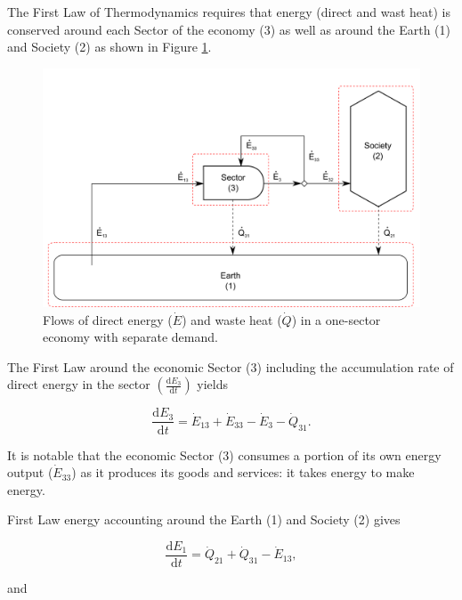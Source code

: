 The First Law of Thermodynamics requires that energy (direct and wast heat) is conserved around each Sector of the economy (3) as well as around the Earth (1) and Society (2) as shown in Figure \ref{fig:direct_energy_flows}. 

\begin{figure}[h!]
\includegraphics[width=1.0\linewidth]{Chapter_Example_B/images/I-O_two_sector_direct_energy.pdf}
\caption{Flows of direct energy ($\dot{E}$) and waste heat ($\dot{Q}$) in a one-sector economy with separate demand.}
\label{fig:direct_energy_flows}
\end{figure}

The First Law around the economic Sector (3) including the accumulation rate of direct energy in the sector $\left(\frac{\mathrm{d}E_{3}}{\mathrm{d}t}\right)$ yields

\begin{equation} \label{eq:CV_E_dot_3}
	\frac{\mathrm{d}E_{3}}{\mathrm{d}t} 	 = \dot{E}_{13} + \dot{E}_{33} - \dot{E}_{3} - \dot{Q}_{31}.
\end{equation}

\noindent It is notable that the economic Sector (3) consumes a portion of its own energy output ($\dot{E}_{33}$) as it produces its goods and services: it takes energy to make energy.

First Law energy accounting around the Earth (1) and Society (2) gives

\begin{equation} \label{eq:CV_E_dot_1}
	\frac{\mathrm{d}E_{1}}{\mathrm{d}t} 	 =  \dot{Q}_{21} + \dot{Q}_{31} - \dot{E}_{13},
\end{equation}

\noindent and 

